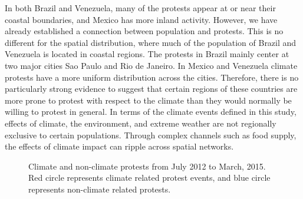 \documentclass[9pt,twocolumn,twoside]{pnas-new}
\begin{document}
In both Brazil and Venezuela, many of the protests appear at or near their coastal boundaries, and Mexico has more inland activity.
However, we have already established a connection between population and protests.
This is no different for the spatial distribution, where much of the population of Brazil and Venezuela is located in coastal regions.
The protests in Brazil mainly center at two major cities Sao Paulo and Rio de Janeiro.
In Mexico and Venezuela climate protests have a more uniform distribution across the cities.
Therefore, there is no particularly strong evidence to suggest that certain regions of these countries are more prone to protest with respect to the climate than they would normally be willing to protest in general.
In terms of the climate events defined in this study, effects of climate, the environment, and extreme weather are not regionally exclusive to certain populations.
Through complex channels such as food supply, the effects of climate impact can ripple across spatial networks.

\begin{figure}[ht]
	\centering
	\caption{Climate and non-climate protests from July 2012 to March, 2015. Red circle represents climate related protest events, and blue circle represents non-climate related protests. }
\label{climate-map}
\end{figure}
\end{document}
